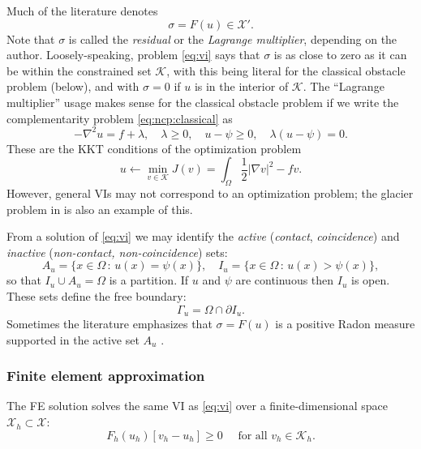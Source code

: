 \documentclass[11pt]{article}
\newcommand{\cK}{\ensuremath{\mathcal{K}}}
\newcommand{\cX}{\ensuremath{\mathcal{X}}}
\newcommand{\grad}{\ensuremath{\nabla}}
\begin{document}
Much of the literature \cite[for example]{NochettoSiebertVeeser2003} denotes
\begin{equation}
\sigma = F(u) \in \cX'. \label{eq:sigma}
\end{equation}
Note that $\sigma$ is called the \emph{residual} or the \emph{Lagrange multiplier}, depending on the author.  Loosely-speaking, problem \eqref{eq:vi} says that $\sigma$ is as close to zero as it can be within the constrained set $\cK$, with this being literal for the classical obstacle problem (below), and with $\sigma=0$ if $u$ is in the interior of $\cK$.  The ``Lagrange multiplier'' usage makes sense for the classical obstacle problem if we write the complementarity problem \eqref{eq:ncp:classical} as
\begin{equation} \label{eq:ncplagrange}
  -\nabla^2 u = f + \lambda, \quad \lambda \geq 0, \quad u - \psi \geq 0, \quad \lambda (u - \psi) = 0.
\end{equation}
These are the KKT conditions \cite{NocedalWright2006} of the optimization problem
\begin{equation}
u \longleftarrow \min_{v\in\cK} J(v) = \int_\Omega \frac{1}{2} |\grad v|^2 - fv.\label{eq:min}
\end{equation}
However, general VIs may not correspond to an optimization problem; the glacier problem in \cite{FochesattoBueler2025} is also an example of this.

From a solution of \eqref{eq:vi} we may identify the \emph{active} (\emph{contact}, \emph{coincidence}) and \emph{inactive} (\emph{non-contact, non-coincidence}) sets:
\begin{equation}
  A_u = \{x\in\Omega \,:\, u(x)=\psi(x)\}, \quad I_u = \{x \in \Omega \,:\, u(x) > \psi(x)\}, \label{eq:sets}
\end{equation}
so that $I_u \cup A_u = \Omega$ is a partition.  If $u$ and $\psi$ are continuous then $I_u$ is open.  These sets define the free boundary:
\begin{equation}
  \Gamma_u = \Omega \cap \partial I_u. \label{eq:freebdry}
\end{equation}
Sometimes the literature emphasizes that $\sigma=F(u)$ is a positive Radon measure supported in the active set $A_u$ \cite{KinderlehrerStampacchia1980}.

\subsubsection*{Finite element approximation}  The FE solution solves the same VI as \eqref{eq:vi} over a finite-dimensional space $\cX_h\subset\cX$:
\begin{equation}
F_h(u_h)[v_h-u_h] \ge 0 \quad \text{ for all } v_h \in \cK_h. \label{eq:fe:vi}
\end{equation}
\end{document}
